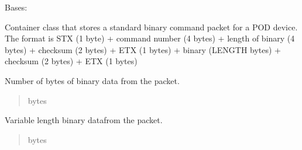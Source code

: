 \documentclass[letterpaper,10pt,english]{sphinxmanual}
\begin{document}
\begin{fulllineitems}
\label{\detokenize{PodApi.Packets:PodApi.Packets.Binary.PacketBinary}}
\pysigstartsignatures
{}
\pysigstopsignatures
\sphinxAtStartPar
Bases: {\hyperref[\detokenize{PodApi.Packets:PodApi.Packets.Packet.Packet}]{}}

\sphinxAtStartPar
Container class that stores a standard binary command packet for a POD device. The format is     STX (1 byte) + command number (4 bytes) + length of binary (4 bytes) + checksum (2 bytes)     + ETX (1 bytes) + binary (LENGTH bytes) + checksum (2 bytes) + ETX (1 bytes)

\begin{fulllineitems}
\label{\detokenize{PodApi.Packets:PodApi.Packets.Binary.PacketBinary.binaryLength}}
\pysigstartsignatures
{}
\pysigstopsignatures
\sphinxAtStartPar
Number of bytes of binary data from the packet.
\begin{quote}\begin{description}
\sphinxAtStartPar
bytes

\end{description}\end{quote}

\end{fulllineitems}


\begin{fulllineitems}
\label{\detokenize{PodApi.Packets:PodApi.Packets.Binary.PacketBinary.binaryData}}
\pysigstartsignatures
{}
\pysigstopsignatures
\sphinxAtStartPar
Variable length binary datafrom the packet.
\begin{quote}\begin{description}
\sphinxAtStartPar
bytes


\end{description}
\end{quote}
\end{fulllineitems}
\end{fulllineitems}
\end{document}
